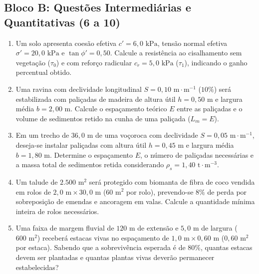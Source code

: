 \subsection*{Bloco B: Questões Intermediárias e Quantitativas (6 a 10)}
\begin{enumerate}[leftmargin=1.8em, itemsep=6pt, start=6]
  \item Um solo apresenta coesão efetiva $c' = 6{,}0\text{ kPa}$, tensão normal efetiva $\sigma' = 20{,}0\text{ kPa}$ e $\tan\phi' = 0{,}50$. Calcule a resistência ao cisalhamento sem vegetação ($\tau_0$) e com reforço radicular $c_r = 5{,}0\text{ kPa}$ ($\tau_1$), indicando o ganho percentual obtido.
  \espacoResolucao[2.1cm]

  \item Uma ravina com declividade longitudinal $S = 0{,}10\text{ m}\cdot\text{m}^{-1}$ ($10\%$) será estabilizada com paliçadas de madeira de altura útil $h = 0{,}50\text{ m}$ e largura média $b = 2{,}00\text{ m}$. Calcule o espaçamento teórico $E$ entre as paliçadas e o volume de sedimentos retido na cunha de uma paliçada ($L_m = E$).
  \espacoResolucao[2.1cm]

  \item Em um trecho de $36{,}0\text{ m}$ de uma voçoroca com declividade $S = 0{,}05\text{ m}\cdot\text{m}^{-1}$, deseja-se instalar paliçadas com altura útil $h = 0{,}45\text{ m}$ e largura média $b = 1{,}80\text{ m}$. Determine o espaçamento $E$, o número de paliçadas necessárias e a massa total de sedimentos retida considerando $\rho_s = 1{,}40\text{ t}\cdot\text{m}^{-3}$.
  \espacoResolucao[2.1cm]

  \item Um talude de $2.500\text{ m}^2$ será protegido com biomanta de fibra de coco vendida em rolos de $2{,}0\text{ m} \times 30{,}0\text{ m}$ ($60\text{ m}^2$ por rolo), prevendo-se $8\%$ de perda por sobreposição de emendas e ancoragem em valas. Calcule a quantidade mínima inteira de rolos necessários.
  \espacoResolucao[2.1cm]

  \item Uma faixa de margem fluvial de $120\text{ m}$ de extensão e $5{,}0\text{ m}$ de largura ($600\text{ m}^2$) receberá estacas vivas no espaçamento de $1{,}0\text{ m} \times 0{,}60\text{ m}$ ($0{,}60\text{ m}^2$ por estaca). Sabendo que a sobrevivência esperada é de $80\%$, quantas estacas devem ser plantadas e quantas plantas vivas deverão permanecer estabelecidas?
  \espacoResolucao[2.1cm]
\end{enumerate}

